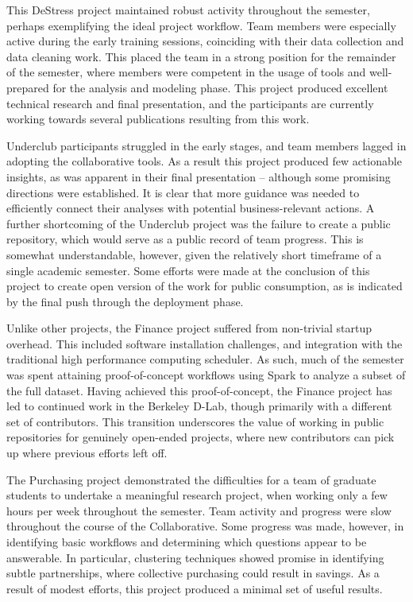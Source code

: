 \documentclass[12pt]{article}
\begin{document}
This DeStress project maintained robust activity throughout the semester, perhaps exemplifying the ideal project workflow.  Team members were especially active during the early training sessions, coinciding with their data collection and data cleaning work.  This placed the team in a strong position for the remainder of the semester, where members were competent in the usage of tools and well-prepared for the analysis and modeling phase.  This project produced excellent technical research and final presentation, and the participants are currently working towards several publications resulting from this work.

Underclub participants struggled in the early stages, and team members lagged in adopting the collaborative tools.  As a result this project produced few actionable insights, as was apparent in their final presentation -- although some promising directions were established. It is clear that more guidance was needed to efficiently connect their analyses with potential business-relevant actions.  A further shortcoming of the Underclub project was the failure to create a public repository, which would serve as a public record of team progress. This is somewhat understandable, however, given the relatively short timeframe of a single academic semester.  Some efforts were made at the conclusion of this project to create open version of the work for public consumption, as is indicated by the final push through the deployment phase.

Unlike other projects, the Finance project suffered from non-trivial startup overhead.  This included software installation challenges, and integration with the traditional high performance computing scheduler. As such, much of the semester was spent attaining proof-of-concept workflows using Spark to analyze a subset of the full dataset.  Having achieved this proof-of-concept, the Finance project has led to continued work in the Berkeley D-Lab, though primarily with a different set of contributors. This transition underscores the value of working in public repositories for genuinely open-ended projects, where new contributors can pick up where previous efforts left off.

The Purchasing project demonstrated the difficulties for a team of graduate students to undertake a meaningful research project, when working only a few hours per week throughout the semester.  Team activity and progress were slow throughout the course of the Collaborative.  Some progress was made, however, in identifying basic workflows and determining which questions appear to be answerable. In particular, clustering techniques showed promise in identifying subtle partnerships, where collective purchasing could result in savings.  As a result of modest efforts, this project produced a minimal set of useful results.
\end{document}
